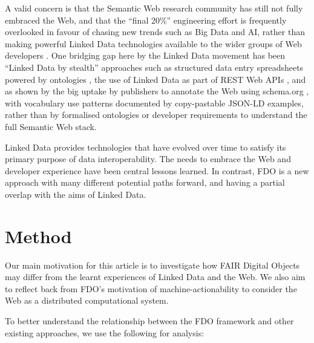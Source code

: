 \documentclass[fleqn,10pt,lineno]{wlpeerjlua}
\begin{document}
A valid concern is that the Semantic Web research community has still not fully embraced the Web, and that the ``final 20\%'' engineering effort is frequently overlooked in favour of chasing new trends such as Big Data and AI, rather than making powerful Linked Data technologies available to the wider groups of Web developers \autocite{verborghSemanticWebIdentity2020a}. One bridging gap here by the Linked Data movement has been ``Linked Data by stealth'' approaches such as structured data entry spreadsheets powered by ontologies \autocite{wolstencroftRightFieldEmbeddingOntology2011b}, the use of Linked Data as part of REST Web APIs \autocite{pageRESTLinkedData2011}, and as shown by the big uptake by publishers to annotate the Web using schema.org \autocite{bernsteinNewLookSemantic2016a}, with vocabulary use patterns documented by copy-pastable JSON-LD examples, rather than by formalised ontologies or developer requirements to understand the full Semantic Web stack.

Linked Data provides technologies that have evolved over time to satisfy its primary purpose of data interoperability. The needs to embrace the Web and developer experience have been central lessons learned.  In contrast, FDO is a new approach with many different potential paths forward, and having a partial overlap with the aims of Linked Data.



\section*{Method}

Our main motivation for this article is to investigate how FAIR Digital Objects may differ from the learnt experiences of Linked Data and the Web. We also aim to reflect back from FDO's motivation of machine-actionability to consider the Web as a distributed computational system.

To better understand the relationship between the FDO framework and other existing approaches, we use the following for analysis:
\end{document}
